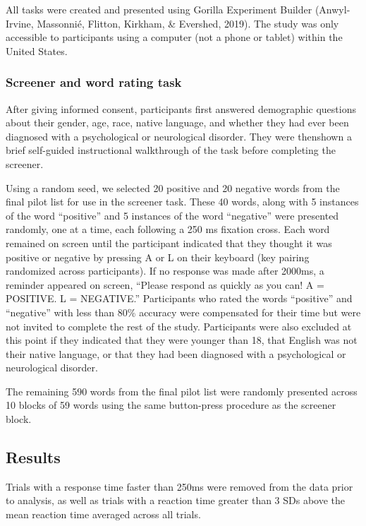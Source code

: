 \documentclass[man]{apa6}
\begin{document}
All tasks were created and presented using Gorilla Experiment Builder (Anwyl-Irvine, Massonnié, Flitton, Kirkham, \& Evershed, 2019). The study was only accessible to participants using a computer (not a phone or tablet) within the United States.

\hypertarget{screener-and-word-rating-task}{%
\subsubsection{Screener and word rating task}\label{screener-and-word-rating-task}}

After giving informed consent, participants first answered demographic questions about their gender, age, race, native language, and whether they had ever been diagnosed with a psychological or neurological disorder. They were thenshown a brief self-guided instructional walkthrough of the task before completing the screener.

Using a random seed, we selected 20 positive and 20 negative words from the final pilot list for use in the screener task. These 40 words, along with 5 instances of the word \enquote{positive} and 5 instances of the word \enquote{negative} were presented randomly, one at a time, each following a 250 ms fixation cross. Each word remained on screen until the participant indicated that they thought it was positive or negative by pressing A or L on their keyboard (key pairing randomized across participants). If no response was made after 2000ms, a reminder appeared on screen, \enquote{Please respond as quickly as you can! A = POSITIVE. L = NEGATIVE.} Participants who rated the words \enquote{positive} and \enquote{negative} with less than 80\% accuracy were compensated for their time but were not invited to complete the rest of the study. Participants were also excluded at this point if they indicated that they were younger than 18, that English was not their native language, or that they had been diagnosed with a psychological or neurological disorder.

The remaining 590 words from the final pilot list were randomly presented across 10 blocks of 59 words using the same button-press procedure as the screener block.

\hypertarget{results}{%
\subsection{Results}\label{results}}

Trials with a response time faster than 250ms were removed from the data prior to analysis, as well as trials with a reaction time greater than 3 SDs above the mean reaction time averaged across all trials.
\end{document}
